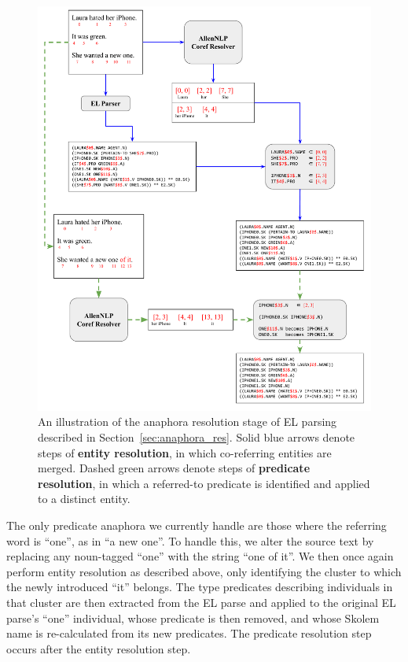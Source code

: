 \begin{figure}
    \centering
    \includegraphics[width=0.99\columnwidth]{CH2_el/coref_fig.pdf}
    \caption{An illustration of the anaphora resolution stage of EL parsing described in Section~\ref{sec:anaphora_res}. Solid blue arrows denote steps of \textbf{entity resolution}, in which co-referring entities are merged. Dashed green arrows denote steps of \textbf{predicate resolution}, in which a referred-to predicate is identified and applied to a distinct entity.}
    \label{fig:coref_process}
\end{figure}

The only predicate anaphora we currently handle are those where the referring word is ``one'', as in ``a new one''. To handle this, we alter the source text by replacing any noun-tagged ``one'' with the string ``one of it''. We then once again perform entity resolution as described above, only identifying the cluster to which the newly introduced ``it'' belongs. The type predicates describing individuals in that cluster are then extracted from the EL parse and applied to the original EL parse's ``one'' individual, whose  predicate is then removed, and whose Skolem name is re-calculated from its new predicates. The predicate resolution step occurs after the entity resolution step.

